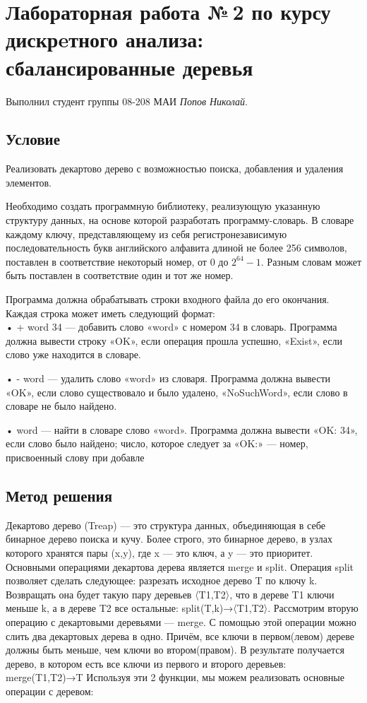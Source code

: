\documentclass[12pt]{article}
\begin{document}
\section*{Лабораторная работа №\,2 по курсу дискрeтного анализа: сбалансированные деревья}

Выполнил студент группы 08-208 МАИ \textit{Попов Николай}.

\subsection*{Условие}


Реализовать декартово дерево с возможностью поиска, добавления и удаления элементов.

Необходимо создать программную библиотеку, реализующую указанную структуру данных, на основе которой разработать программу-словарь. В словаре каждому ключу, представляющему из себя регистронезависимую последовательность букв английского алфавита длиной не более 256 символов, поставлен в соответствие некоторый номер, от 0 до $2^{64} - 1$. Разным словам может быть поставлен в соответствие один и тот же номер.

Программа должна обрабатывать строки входного файла до его окончания. Каждая строка может иметь следующий формат: \\

• + word 34 — добавить слово «word» с номером 34 в словарь. Программа должна вывести строку «OK», если операция прошла успешно, «Exist», если слово уже находится в словаре.

• - word — удалить слово «word» из словаря. Программа должна вывести «OK», если слово существовало и было удалено, «NoSuchWord», если слово в словаре не было найдено.

• word — найти в словаре слово «word». Программа должна вывести «OK: 34», если слово было найдено; число, которое следует за «OK:» — номер, присвоенный слову при добавле



\subsection*{Метод решения}

Декартово дерево (Treap) — это структура данных, объединяющая в себе бинарное
дерево поиска и кучу. Более строго, это бинарное дерево, в узлах которого хранятся
пары (x,y), где x — это ключ, а y — это приоритет. Основными операциями декартова
дерева является merge и split.
Операция split позволяет сделать следующее: разрезать исходное дерево T по ключу k.
Возвращать она будет такую пару деревьев 〈T1,T2〉, что в дереве T1 ключи меньше k,
а в дереве T2 все остальные: split(T,k)→〈T1,T2〉.
Рассмотрим вторую операцию с декартовыми деревьями — merge. С помощью этой
операции можно слить два декартовых дерева в одно. Причём, все ключи в первом(левом)
дереве должны быть меньше, чем ключи во втором(правом). В результате получается
дерево, в котором есть все ключи из первого и второго деревьев: merge(T1,T2)→T
Используя эти 2 функции, мы можем реализовать основные операции с деревом:\\
\end{document}
